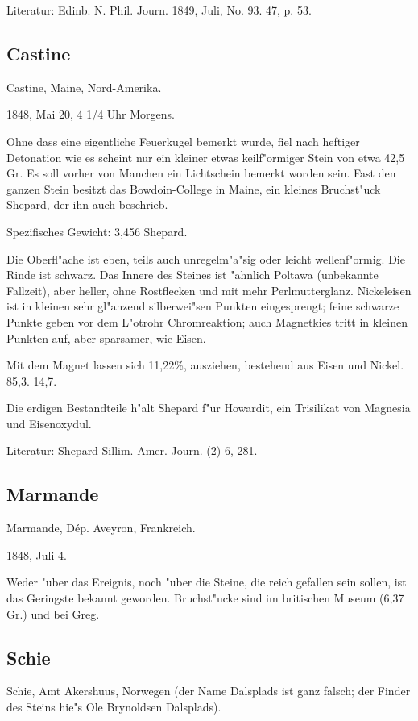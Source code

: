 \documentclass[a4paper, 11pt, oneside]{article}
\begin{document}
Literatur: Edinb. N. Phil. Journ. 1849, Juli, No. 93. 47, p. 53.

\subsection{Castine}

Castine, Maine, Nord-Amerika.

1848, Mai 20, 4 1/4 Uhr Morgens.

Ohne dass eine eigentliche Feuerkugel bemerkt wurde, fiel nach heftiger Detonation wie es scheint nur ein kleiner etwas keilf"ormiger Stein von etwa 42,5 Gr. Es soll vorher von Manchen ein Lichtschein bemerkt worden sein. Fast den ganzen Stein besitzt das Bowdoin-College in Maine, ein kleines Bruchst"uck Shepard, der ihn auch beschrieb.

Spezifisches Gewicht: 3,456 Shepard.

Die Oberfl"ache ist eben, teils auch unregelm"a"sig oder leicht wellenf"ormig. Die Rinde ist schwarz. Das Innere des Steines ist "ahnlich Poltawa (unbekannte Fallzeit), aber heller, ohne Rostflecken und mit mehr Perlmutterglanz. Nickeleisen ist in kleinen sehr gl"anzend silberwei"sen Punkten eingesprengt; feine schwarze Punkte geben vor dem L"otrohr Chromreaktion; auch Magnetkies tritt in kleinen Punkten auf, aber sparsamer, wie Eisen.

Mit dem Magnet lassen sich 11,22\%, ausziehen, bestehend aus  
Eisen und Nickel.  
85,3. 14,7.

Die erdigen Bestandteile h"alt Shepard f"ur Howardit, ein Trisilikat von Magnesia und Eisenoxydul.

Literatur: Shepard Sillim. Amer. Journ. (2) 6, 281.

\subsection{Marmande}

Marmande, Dép. Aveyron, Frankreich.

1848, Juli 4.

Weder "uber das Ereignis, noch "uber die Steine, die reich gefallen sein sollen, ist das Geringste bekannt geworden. Bruchst"ucke sind im britischen Museum (6,37 Gr.) und bei Greg.

\subsection{Schie}

Schie, Amt Akershuus, Norwegen (der Name Dalsplads ist ganz falsch; der Finder des Steins hie"s Ole Brynoldsen Dalsplads).
\end{document}
